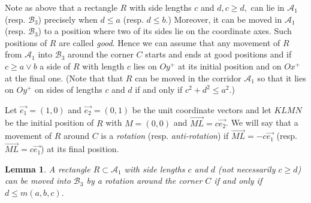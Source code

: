 \documentclass[12pt]{amsart}
\newtheorem{lem}[thm]{Lemma}
\def\A{\mathcal A}
\def\B{\mathcal B}
\def\n{\noindent}
\def\ss{\subset}
\begin{document}
\n{\it Proof.} Note as above that a rectangle $R$ with side
lengths $c$ and $d , c\ge d , $ can lie in  $\A_1$ (resp. $\B_3$)
precisely when $d\le a$ (resp. $d\le b.$) Moreover, it can be
moved in $\A_1$ (resp. $\B_3$) to a position where two of its
sides lie on the coordinate axes. Such positions of $R$ are called
{\it good}. Hence we can assume that any movement of $R$ from
$\A_1$ into $\B_3$ around the corner $C$ starts and ends at good
positions and if $c\ge a\vee b$ a  side of $R$ with length $c$
lies on $Oy^+$ at its initial position and on $Ox^+$ at the final
one. (Note that that $R$ can be moved in the corridor $\A_1$ so
that it lies on $Oy^+$ on sides of lengths $c$ and $d$ if and only
if $c^2+d^2\le a^2$.)

Let $\overrightarrow{e_1}=(1,0)$ and
$\overrightarrow{e_2}=(0,1)$ be the unit coordinate vectors and
let $KLMN $ be the initial position of $R$ with $M=(0,0)$ and
$\overrightarrow{ML}=c\overrightarrow{e_2}$. We will say that a
movement of $R$ around $C$ is a \emph{rotation} (resp.
\emph{anti-rotation}) if $\overrightarrow{ML} =
-c\overrightarrow{e_1}$ (resp. $\overrightarrow{ML} =
c\overrightarrow{e_1}$) at its final position.

\begin{lem}\label{l2} A rectangle $R\ss \A_1$ with side lengths
$c$ and $d$ (not necessarily $c\ge d$) can be moved into $\B_3$ by
a rotation around the corner $C$ if and only if $d\le m(a,b,c).$
\end{lem}
\end{document}
